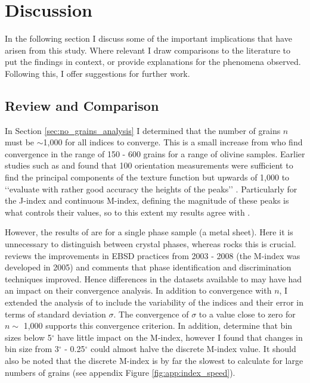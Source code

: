 \documentclass[a4paper,12pt,twoside]{report}
\numberwithin{equation}{chapter}
\begin{document}
\chapter{Discussion} \label{chap:discussion}
\vspace{-1cm}
In the following section I discuss some of the important implications that have arisen from this study. Where relevant I draw comparisons to the literature to put the findings in context, or provide explanations for the phenomena observed. Following this, I offer suggestions for further work.


\section{Review and Comparison} \label{sec:diss_results_comp}

In Section \ref{sec:no_grains_analysis} I determined that the number of grains $n$ must be $\sim$1,000 for all indices to converge. This is a small increase from \cite{Skemer} who find convergence in the range of 150 - 600 grains for a range of olivine samples. Earlier studies such as \cite{Wright1990} and \cite{Baudin1993} found that 100 orientation measurements were sufficient to find the principal components of the texture function but upwards of 1,000 to \lq\lq{}evaluate with rather good accuracy the heights of the peaks\rq\rq{} \citep{Baudin1993}. Particularly for the J-index and continuous M-index, defining the magnitude of these peaks is what controls their values, so to this extent my results agree with \cite{Baudin1993}. 

However, the results of \cite{Baudin1993} are for a single phase sample (a metal sheet). Here it is unnecessary to distinguish between crystal phases, whereas rocks this is crucial. \cite{Randle2009} reviews the improvements in EBSD practices from 2003 - 2008 (the M-index was developed in 2005) and comments that phase identification and discrimination techniques improved. Hence differences in the datasets available to \cite{Skemer} may have had an impact on their convergence analysis. In addition to convergence with $n$, I extended the analysis of \cite{Skemer} to include the variability of the indices and their error in terms of standard deviation $\sigma$. The convergence of $\sigma$ to a value close to zero for     
$n \sim$ 1,000 supports this convergence criterion. In addition, \cite{Skemer} determine that bin sizes below 5$^\circ$ have little impact on the M-index, however I found that changes in bin size from 3$^\circ$ - 0.25$^\circ$ could almost halve the discrete M-index value. It should also be noted that the discrete M-index is by far the slowest to calculate for large numbers of grains (see appendix Figure \ref{fig:app:index_speed}).
\end{document}
